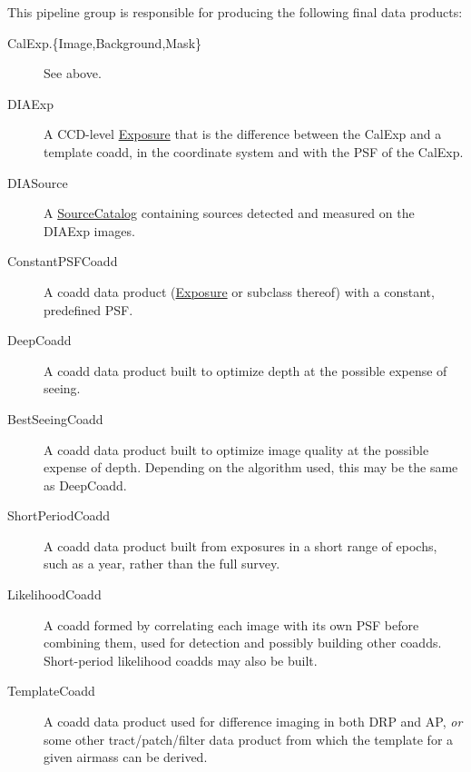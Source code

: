 This pipeline group is responsible for producing the following final data products:
\begin{description}
\item[CalExp.\{Image,Background,Mask\}]  See above.
\item[DIAExp] A CCD-level \hyperref[sec:spImagesExposure]{Exposure} that is the difference between the CalExp and a template coadd, in the coordinate system and with the PSF of the CalExp.
\item[DIASource] A \hyperref[sec:spTablesSource]{SourceCatalog} containing sources detected and measured on the DIAExp images.
\item[ConstantPSFCoadd] A coadd data product (\hyperref[sec:spImagesExposure]{Exposure} or subclass thereof) with a constant, predefined PSF.
\item[DeepCoadd] A coadd data product built to optimize depth at the possible expense of seeing.
\item[BestSeeingCoadd] A coadd data product built to optimize image quality at the possible expense of depth.  Depending on the algorithm used, this may be the same as DeepCoadd.
\item[ShortPeriodCoadd] A coadd data product built from exposures in a short range of epochs, such as a year, rather than the full survey.
\item[LikelihoodCoadd] A coadd formed by correlating each image with its own PSF before combining them, used for detection and possibly building other coadds.  Short-period likelihood coadds may also be built.
\item[TemplateCoadd] A coadd data product used for difference imaging in both DRP and AP, \emph{or} some other tract/patch/filter data product from which the template for a given airmass can be derived.
\end{description}

